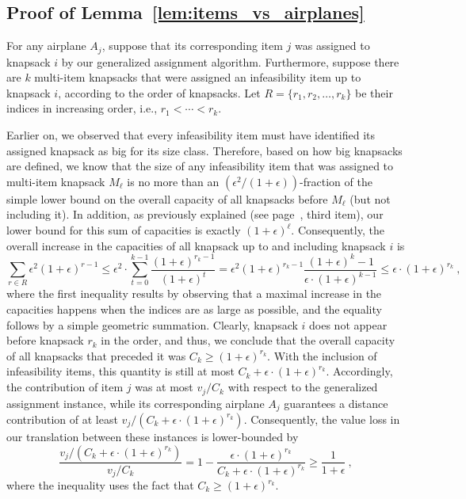 \documentclass[11pt]{article}
\theoremstyle{plain}
\theoremstyle{definition}
\begin{document}
\subsection{Proof of Lemma~\ref{lem:items_vs_airplanes}}

For any airplane $A_j$, suppose that its corresponding item $j$ was assigned to knapsack $i$ by our generalized assignment algorithm. Furthermore, suppose there are $k$ multi-item knapsacks that were assigned an infeasibility item up to knapsack $i$, according to the order of knapsacks. Let $R =\{r_1, r_2, \ldots, r_k\}$ be their indices in increasing order, i.e., $r_1 < \cdots < r_k$.

Earlier on, we observed that every infeasibility item must have identified its assigned knapsack as big for its size class. Therefore, based on how big knapsacks are defined, we know that the size of any infeasibility item that was assigned to multi-item knapsack $M_\ell$ is no more than an $(\epsilon^2/ (1+\epsilon))$-fraction of the simple lower bound on the overall capacity of all knapsacks before $M_\ell$ (but not including it). In addition, as previously explained (see page~\pageref{items:properties_instance}, third item), our lower bound for this sum of capacities is exactly $(1+\epsilon)^\ell$. Consequently, the overall increase in the capacities of all knapsack up to and including knapsack $i$ is
$$
\sum_{r \in R} \epsilon^2 (1+\epsilon)^{r-1} \leq \epsilon^2 \cdot \sum_{t = 0}^{k - 1} \frac{(1+\epsilon)^{r_k - 1}}{(1+\epsilon)^t} = \epsilon^2 (1+\epsilon)^{r_k - 1} \frac{(1+\epsilon)^{k} - 1}{\epsilon \cdot (1+\epsilon)^{k-1}} \leq \epsilon \cdot (1+\epsilon)^{r_k} \ ,
$$
where the first inequality results by observing that a maximal increase in the capacities happens when the indices are as large as possible, and the equality follows by a simple geometric summation. Clearly, knapsack $i$ does not appear before knapsack $r_k$ in the order, and thus, we conclude that the overall capacity of all knapsacks that preceded it was $C_k \geq (1+\epsilon)^{r_k}$. With the inclusion of infeasibility items, this quantity is still at most $C_k + \epsilon \cdot (1+\epsilon)^{r_k}$. Accordingly, the contribution of item $j$ was at most $v_j / C_k$ with respect to the generalized assignment instance, while its corresponding airplane $A_j$ guarantees a distance contribution of at least $v_j / (C_k + \epsilon \cdot (1+\epsilon)^{r_k})$. Consequently, the value loss in our translation between these instances is lower-bounded by
$$
\frac{v_j / (C_k + \epsilon \cdot (1+\epsilon)^{r_k})}{v_j / C_k} = 1 - \frac{\epsilon \cdot (1+\epsilon)^{r_k}}{C_k+\epsilon \cdot (1+\epsilon)^{r_k}} \geq  \frac{1}{1+\epsilon} \ ,
$$
where the inequality uses the fact that $C_k \geq (1+\epsilon)^{r_k}$.
\end{document}
